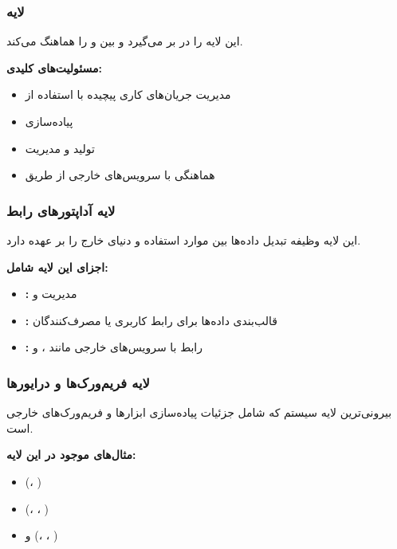 \subsubsection{لایه }

این لایه  را در بر می‌گیرد و  بین  و  را هماهنگ می‌کند.

\noindent
\textbf{مسئولیت‌های کلیدی:}
\begin{itemize}
    \item مدیریت جریان‌های کاری پیچیده با استفاده از 
    \item پیاده‌سازی 
    \item تولید و مدیریت 
    \item هماهنگی با سرویس‌های خارجی از طریق 
\end{itemize}

\subsubsection{لایه آداپتورهای رابط }

این لایه وظیفه تبدیل داده‌ها بین موارد استفاده و دنیای خارج را بر عهده دارد.

\noindent
\textbf{اجزای این لایه شامل:}
\begin{itemize}
    \item \textbf{:} مدیریت  و 
    \item \textbf{:} قالب‌بندی داده‌ها برای رابط کاربری یا مصرف‌کنندگان 
    \item \textbf{:} رابط با سرویس‌های خارجی مانند ،  و 
\end{itemize}

\subsubsection{لایه فریم‌ورک‌ها و درایورها }

بیرونی‌ترین لایه سیستم که شامل جزئیات پیاده‌سازی ابزارها و فریم‌ورک‌های خارجی است.

\noindent
\textbf{مثال‌های موجود در این لایه:}
\begin{itemize}
    \item {} (، )
    \item {} (، ، )
    \item {} و  (، ، )
\end{itemize}

